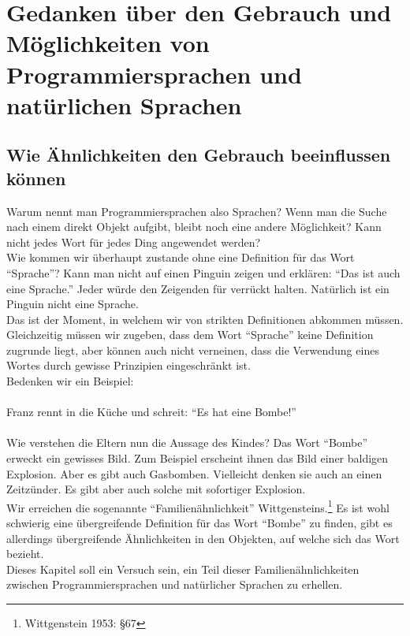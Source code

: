 \documentclass[10pt,a4paper]{article}
\begin{document}
\section{Gedanken über den Gebrauch und Möglichkeiten von Programmiersprachen und natürlichen Sprachen}

\subsection{Wie Ähnlichkeiten den Gebrauch beeinflussen können}
Warum nennt man Programmiersprachen also Sprachen? Wenn man die Suche nach einem direkt Objekt aufgibt, bleibt noch eine andere Möglichkeit? Kann nicht jedes Wort für jedes Ding angewendet werden? \\
Wie kommen wir überhaupt zustande ohne eine Definition für das Wort \enquote{Sprache}? Kann man nicht auf einen Pinguin zeigen und erklären: \enquote{Das ist auch eine Sprache.} Jeder würde den Zeigenden für verrückt halten. Natürlich ist ein Pinguin nicht eine Sprache. \\
Das ist der Moment, in welchem wir von strikten Definitionen abkommen müssen. Gleichzeitig müssen wir zugeben, dass dem Wort \enquote{Sprache} keine Definition zugrunde liegt, aber können auch nicht verneinen, dass die Verwendung eines Wortes durch gewisse Prinzipien eingeschränkt ist. \\
Bedenken wir ein Beispiel: \\
\\
Franz rennt in die Küche und schreit: \enquote{Es hat eine Bombe!} \\
\\
Wie verstehen die Eltern nun die Aussage des Kindes? Das Wort \enquote{Bombe} erweckt ein gewisses Bild. Zum Beispiel erscheint ihnen das Bild einer baldigen Explosion. Aber es gibt auch Gasbomben. Vielleicht denken sie auch an einen Zeitzünder. Es gibt aber auch solche mit sofortiger Explosion. \\
Wir erreichen die sogenannte \enquote{Familienähnlichkeit} Wittgensteins.\footnote{Wittgenstein 1953: §67} Es ist wohl schwierig eine übergreifende Definition für das Wort \enquote{Bombe} zu finden, gibt es allerdings übergreifende Ähnlichkeiten in den Objekten, auf welche sich das Wort bezieht. \\
Dieses Kapitel soll ein Versuch sein, ein Teil dieser Familienähnlichkeiten zwischen Programmiersprachen und natürlicher Sprachen zu erhellen.
\end{document}
